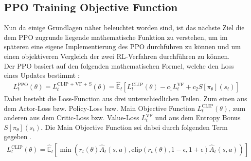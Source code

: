 \subsection{PPO Training Objective Function}
Nun da einige Grundlagen näher beleuchtet worden sind, ist das nächste Ziel die dem PPO zugrunde liegende mathematische Funktion zu verstehen, um im späteren eine eigene Implementierung des PPO durchführen zu können und um einen objektiveren Vergleich der zwei RL-Verfahren durchführen zu können.
\\Der PPO basiert auf den folgenden mathematischen Formel, welche den Loss eines Updates bestimmt \cite[S. 5]{PPO}:
\begin{align}
	\label{PPO_Training_Loss}
	L^\text{PPO}_{t} (\theta) = L^\text{CLIP + VF + S}_{t} (\theta) = \mathbb{\hat{E}}_{t} [L^{\text{CLIP}}_{t}(\theta) - c_{1}L^{\text{VF}}_{t} + c_{2}S[\pi_{\theta}](s_{t})]
\end{align}
Dabei besteht die Loss-Function aus drei unterschiedlichen Teilen. Zum einen aus dem Actor-Loss bzw. Policy-Loss bzw. Main Objective Function $L^{\text{CLIP}}_{t}(\theta)$, zum anderen aus dem Critic-Loss bzw. Value-Loss $L^{\text{VF}}_{t}$ und aus dem Entropy Bonus $S[\pi_{\theta}](s_{t})$. Die Main Objective Function sei dabei durch folgenden Term gegeben \cite[S. 3]{PPO}.
\begin{align}
	\label{clip_loss_ppo}
	L^\text{CLIP}_{t} (\theta) = \mathbb{\hat{E}}_{t} [ \min(r_{t}(\theta) \hat{A}_{t}(s, a), \text{clip}(r_{t}(\theta), 1 - \epsilon, 1 + \epsilon) \hat{A}_{t}(s, a))]
\end{align}


